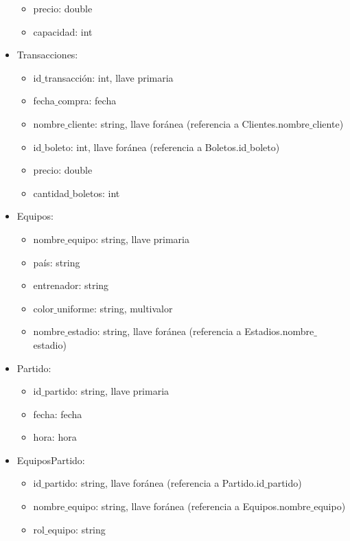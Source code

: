 \begin{itemize}
\begin{itemize}
        \item precio: double
        \item capacidad: int        
    \end{itemize}
    \item Transacciones:
    \begin{itemize}
        \item id$\_$transacción: int, llave primaria
        \item fecha$\_$compra: fecha
        \item nombre$\_$cliente: string,  llave foránea (referencia a Clientes.nombre$\_$cliente)
        \item id$\_$boleto: int, llave foránea (referencia a Boletos.id$\_$boleto)
        \item precio: double
        \item cantidad$\_$boletos: int
    \end{itemize}
    \item Equipos:
    \begin{itemize}
        \item nombre$\_$equipo: string, llave primaria
        \item país: string
        \item entrenador: string
        \item color$\_$uniforme: string, multivalor
        \item nombre$\_$estadio: string, llave foránea (referencia a Estadios.nombre$\_$estadio)
    \end{itemize}
    \item Partido:
    \begin{itemize}
        \item id$\_$partido: string, llave primaria
        \item fecha: fecha
        \item hora: hora
    \end{itemize}
    \item EquiposPartido:
    \begin{itemize}        
        \item id$\_$partido: string, llave foránea (referencia a Partido.id$\_$partido)
        \item nombre$\_$equipo: string, llave foránea (referencia a Equipos.nombre$\_$equipo)        
        \item rol$\_$equipo: string
    \end{itemize}
\end{itemize}

